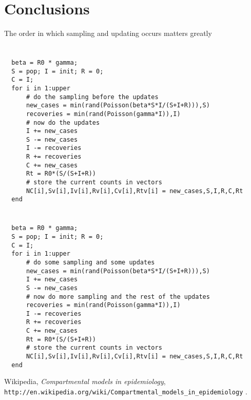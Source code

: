\documentclass[11pt]{article}
\begin{document}
\section{Conclusions}
The order in which sampling and updating occurs matters greatly

\newpage
\appendix
\section{}
\begin{verbatim}
  beta = R0 * gamma; 
  S = pop; I = init; R = 0;
  C = I;  
  for i in 1:upper
      # do the sampling before the updates
      new_cases = min(rand(Poisson(beta*S*I/(S+I+R))),S)
      recoveries = min(rand(Poisson(gamma*I)),I)
      # now do the updates
      I += new_cases
      S -= new_cases        
      I -= recoveries
      R += recoveries      
      C += new_cases  
      Rt = R0*(S/(S+I+R)) 
      # store the current counts in vectors 
      NC[i],Sv[i],Iv[i],Rv[i],Cv[i],Rtv[i] = new_cases,S,I,R,C,Rt
  end
\end{verbatim}

\section{}
\begin{verbatim}
  beta = R0 * gamma; 
  S = pop; I = init; R = 0;
  C = I;  
  for i in 1:upper
      # do some sampling and some updates
      new_cases = min(rand(Poisson(beta*S*I/(S+I+R))),S)
      I += new_cases
      S -= new_cases   
      # now do more sampling and the rest of the updates    
      recoveries = min(rand(Poisson(gamma*I)),I)
      I -= recoveries
      R += recoveries      
      C += new_cases  
      Rt = R0*(S/(S+I+R)) 
      # store the current counts in vectors 
      NC[i],Sv[i],Iv[i],Rv[i],Cv[i],Rtv[i] = new_cases,S,I,R,C,Rt
  end
\end{verbatim}

\newpage

\begin{thebibliography}{99}

 Wikipedia, {\em Compartmental models in epidemiology},
\verb+http://en.wikipedia.org/wiki/Compartmental_models_in_epidemiology+ .

\end{thebibliography}
\end{document}
